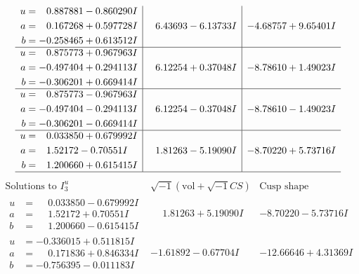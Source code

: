 \documentclass[1p]{elsarticle_modified}
\theoremstyle{definition}
\newcommand{\I}{\sqrt{-1}}
\begin{document}
$$\begin{array}{c|c|c}
\begin{aligned}
u &= \phantom{-}0.887881 - 0.860290 I \\
a &= \phantom{-}0.167268 + 0.597728 I \\
b &= -0.258465 + 0.613512 I\end{aligned}
 & \phantom{-}6.43693 - 6.13733 I & -4.68757 + 9.65401 I \\ \hline\begin{aligned}
u &= \phantom{-}0.875773 + 0.967963 I \\
a &= -0.497404 + 0.294113 I \\
b &= -0.306201 + 0.669414 I\end{aligned}
 & \phantom{-}6.12254 + 0.37048 I & -8.78610 + 1.49023 I \\ \hline\begin{aligned}
u &= \phantom{-}0.875773 - 0.967963 I \\
a &= -0.497404 - 0.294113 I \\
b &= -0.306201 - 0.669414 I\end{aligned}
 & \phantom{-}6.12254 - 0.37048 I & -8.78610 - 1.49023 I \\ \hline\begin{aligned}
u &= \phantom{-}0.033850 + 0.679992 I \\
a &= \phantom{-}1.52172 - 0.70551 I \\
b &= \phantom{-}1.200660 + 0.615415 I\end{aligned}
 & \phantom{-}1.81263 - 5.19090 I & -8.70220 + 5.73716 I\\
 \hline 
 \end{array}$$\newpage$$\begin{array}{c|c|c}  
\text{Solutions to }I^u_{3}& \I (\text{vol} + \sqrt{-1}CS) & \text{Cusp shape}\\
 \hline 
\begin{aligned}
u &= \phantom{-}0.033850 - 0.679992 I \\
a &= \phantom{-}1.52172 + 0.70551 I \\
b &= \phantom{-}1.200660 - 0.615415 I\end{aligned}
 & \phantom{-}1.81263 + 5.19090 I & -8.70220 - 5.73716 I \\ \hline\begin{aligned}
u &= -0.336015 + 0.511815 I \\
a &= \phantom{-}0.171836 + 0.846334 I \\
b &= -0.756395 - 0.011183 I\end{aligned}
 & -1.61892 - 0.67704 I & -12.66646 + 4.31369 I \\ \hline\begin{aligned}

\end{aligned}
\end{array}$$
\end{document}

